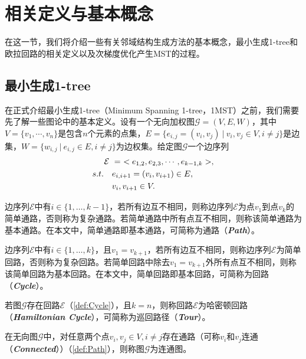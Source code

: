 \section{相关定义与基本概念}
\label{sec:NS_Method:相关定义与基本概念}
在这一节，我们将介绍一些有关邻域结构生成方法的基本概念，最小生成1-tree和欧拉回路的相关定义以及次梯度优化产生MST的过程。

\subsection{最小生成1-tree}
\label{subsec:NS_Method:相关定义与基本概念:最小生成1-tree}
在正式介绍最小生成1-tree（Minimum Spanning 1-tree，1MST）之前，我们需要先了解一些图论中的基本定义。设有一个无向加权图$\mathcal{G} = (V, E, W)$，其中$V = \{ v_1, \cdots, v_n \}$是包含$n$个元素的点集，$E = \{ e_{i,j} = (v_i,v_j) \ | \ v_i,v_j \in V, i \not = j \}$是边集，$W = \{ w_{i,j} \ | \ e_{i,j} \in E, i \not = j\} $为边权集。给定图$\mathcal{G}$一个边序列
\begin{align}
    \label{eq:边序列}
    \mathcal{E} \ & = \ <e_{1,2}, e_{2,3}, \cdots, e_{k-1,k}>, \\
    s.t. \quad & e_{i,i+1} = (v_i, v_{i+1}) \in E, \notag  \\
    & v_i, v_{i+1} \in V. \notag 
\end{align}
\begin{definition}[简单通路]
    \label{def:Path}
    边序列$\mathcal{E}$中有$i \in \{ 1, \dots, k-1 \}$，若所有边互不相同，则称边序列$\mathcal{E}$为点$v_1$到点$v_k$的简单通路，否则称为复杂通路。若简单通路中所有点互不相同，则称该简单通路为基本通路。在本文中，简单通路即基本通路，可简称为通路（\emph{\textbf{Path}}）。
\end{definition}
\begin{definition}[简单回路]
    \label{def:Cycle}
    边序列$\mathcal{E}$中有$i \in \{ 1, \dots, k \}$，且$v_1=v_{k+1}$，若所有边互不相同，则称边序列$\mathcal{E}$为简单回路，否则称为复杂回路。若简单回路中除去$v_1=v_{k+1}$外所有点互不相同，则称该简单回路为基本回路。在本文中，简单回路即基本回路，可简称为回路（\emph{\textbf{Cycle}}）。
\end{definition}
\begin{definition}[哈密顿回路]
    \label{def:Hamiltonian Cycle}
    若图$\mathcal{G}$存在回路$\mathcal{E}$（\autoref{def:Cycle}），且$k=n$，则称回路$\mathcal{E}$为哈密顿回路（\emph{\textbf{Hamiltonian Cycle}}），可简称为巡回路径（\emph{\textbf{Tour}}）。
\end{definition}
\begin{definition}[连通图]
    \label{def:Connected Graph}
    在无向图$\mathcal{G}$中，对任意两个点$v_i, v_j \in V, i \not = j$存在通路（可称$v_i$和$v_j$连通（\emph{\textbf{Connected}}））（\autoref{def:Path}），则称图$\mathcal{G}$为连通图。
\end{definition}
